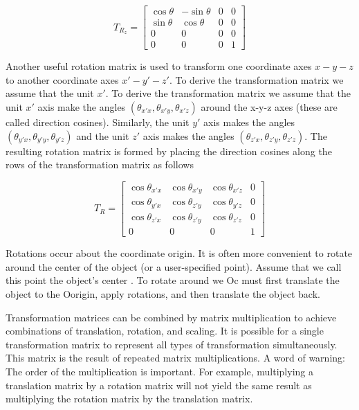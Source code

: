 \begin{equation}\label{eq:3.12}
T_{R_z} = \left[\begin{array}{cccc}
\cos\theta & -\sin\theta & 0 & 0 \\
\sin\theta & \cos\theta & 0 & 0 \\
0 & 0 & 0 & 0 \\
0 & 0 & 0 & 1
\end{array}\right]
\end{equation}

Another useful rotation matrix is used to transform one coordinate axes $x-y-z$ to another coordinate axes $x'-y'-z'$. To derive the transformation matrix we assume that the unit $x'$. To derive the transformation matrix we assume that the unit $x'$ axis make the angles $(\theta_{x'x},\theta_{x'y},\theta_{x'z})$ around the x-y-z axes (these are called direction cosines). Similarly, the unit $y'$ axis makes the angles $(\theta_{y'x},\theta_{y'y},\theta_{y'z})$ and the unit $z'$ axis makes the angles $(\theta_{z'x},\theta_{z'y},\theta_{z'z})$. The resulting rotation matrix is formed by placing the direction cosines along the rows of the transformation matrix as follows

\begin{equation}\label{eq:3.13}
T_R = \left[\begin{array}{cccc}
\cos\theta_{x'x} & \cos\theta_{x'y} & \cos\theta_{x'z} & 0 \\
\cos\theta_{y'x} & \cos\theta_{z'y} & \cos\theta_{y'z} & 0 \\
\cos\theta_{z'x} & \cos\theta_{z'y} & \cos\theta_{z'z} & 0 \\
0 & 0 & 0 & 1
\end{array}\right]
\end{equation}


Rotations occur about the coordinate origin. It is often more convenient to rotate around the center of the object (or a user-specified point). Assume that we call this point the object’s center . To rotate around we Oc must first translate the object to the Oorigin, apply rotations, and then translate the object back.

Transformation matrices can be combined by matrix multiplication to achieve combinations of translation, rotation, and scaling. It is possible for a single transformation matrix to represent all types of transformation simultaneously. This matrix is the result of repeated matrix multiplications. A word of warning: The order of the multiplication is important. For example, multiplying a translation matrix by a rotation matrix will not yield the same result as multiplying the rotation matrix by the translation matrix.

